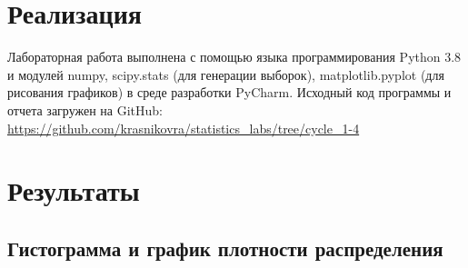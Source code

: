 \documentclass[12pt]{article}
\begin{document}
	\section{Реализация}
	
	Лабораторная работа выполнена с помощью языка программирования Python 3.8 и модулей numpy, scipy.stats (для генерации выборок), matplotlib.pyplot (для рисования графиков) в среде разработки PyCharm. Исходный код программы и отчета загружен на GitHub: \url{https://github.com/krasnikovra/statistics_labs/tree/cycle_1-4}
	
	\section{Результаты}
	
	\subsection{Гистограмма и график плотности распределения}
	
\end{document}
